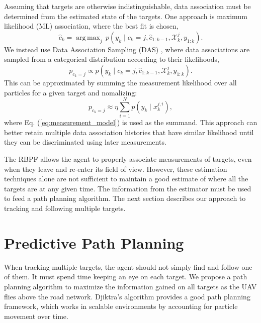 \documentclass[letterpaper, 10 pt, conference]{ieeeconf}  %
\DeclareMathOperator*{\argmax}{arg\,max}
\begin{document}
Assuming that targets are otherwise indistinguishable, data association must be determined from the estimated state of the targets. One approach is maximum likelihood (ML) association, where the best fit is chosen,
\begin{equation}%
    \hat{c}_k = \argmax_{j} \, p(y_k \mid c_k = j, \hat{c}_{1:k-1}, \mathcal{X}^{j}_{k}, y_{1:k}).
\end{equation}
We instead use Data Association Sampling (DAS) \cite{Thrun2006}, where data associations are sampled from a categorical distribution according to their likelihoods,
\begin{equation}%
    p_{c_k=j} \propto p(y_k \mid c_k=j, \hat{c}_{1:k-1}, \mathcal{X}^{j}_{k}, y_{1:k}).
\end{equation}
This can be approximated by summing the measurement likelihood over all particles for a given target and nomalizing:
\begin{equation}%
    p_{c_k=j} \approx \eta \sum_{i=1}^{N} p(y_k \mid x_k^{j, i}),
\end{equation}
where Eq. (\ref{eq:measurement_model}) is used as the summand. This approach can better retain multiple data association histories that have similar likelihood until they can be discriminated using later measurements.

The RBPF allows the agent to properly associate measurements of targets, even when they leave and re-enter its field of view. However, these estimation techniques alone are not sufficient to maintain a good estimate of where all the targets are at any given time. The information from the estimator must be used to feed a path planning algorithm. The next section describes our approach to tracking and following multiple targets.

\section{Predictive Path Planning}\label{predictive_path_planning}
When tracking multiple targets, the agent should not simply find and follow one of them. It must spend time keeping an eye on each target. We propose a path planning algorithm to maximize the information gained on all targets as the UAV flies above the road network. Djiktra's algorithm provides a good path planning framework, which works in scalable environments by accounting for particle movement over time.
\end{document}
